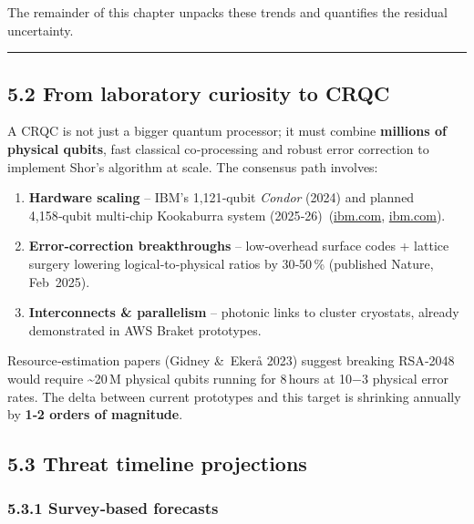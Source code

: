 \documentclass[
  english,
]{article}
\providecommand{\tightlist}{%
  \setlength{\itemsep}{0pt}\setlength{\parskip}{0pt}}
\begin{document}
The remainder of this chapter unpacks these trends and quantifies the
residual uncertainty.

\begin{center}\rule{0.5\linewidth}{0.5pt}\end{center}

\subsection{5.2 From laboratory curiosity to
CRQC}\label{from-laboratory-curiosity-to-crqc}

A CRQC is not just a bigger quantum processor; it must combine
\textbf{millions of physical qubits}, fast classical co‑processing and
robust error correction to implement Shor's algorithm at scale. The
consensus path involves:

\begin{enumerate}
\def\labelenumi{\arabic{enumi}.}
\tightlist
\item
  \textbf{Hardware scaling} -- IBM's 1,121‑qubit \emph{Condor} (2024)
  and planned 4,158‑qubit multi‑chip Kookaburra system
  (2025‑26)~(\href{https://www.ibm.com/quantum/blog/quantum-roadmap-2033?utm_source=chatgpt.com}{ibm.com},
  \href{https://www.ibm.com/quantum/blog/ibm-quantum-roadmap-2025?utm_source=chatgpt.com}{ibm.com}).
\item
  \textbf{Error‑correction breakthroughs} -- low‑overhead surface codes
  + lattice surgery lowering logical‑to‑physical ratios by 30‑50\,\%
  (published Nature, Feb~2025).
\item
  \textbf{Interconnects \& parallelism} -- photonic links to cluster
  cryostats, already demonstrated in AWS Braket prototypes.
\end{enumerate}

Resource‑estimation papers (Gidney \&~Ekerå 2023) suggest breaking
RSA‑2048 would require \textasciitilde20\,M physical qubits running for
8\,hours at 10−3 physical error rates. The delta between current
prototypes and this target is shrinking annually by \textbf{1‑2 orders
of magnitude}.

\subsection{5.3 Threat timeline
projections}\label{threat-timeline-projections}

\subsubsection{5.3.1 Survey‑based
forecasts}\label{surveybased-forecasts}
\end{document}
